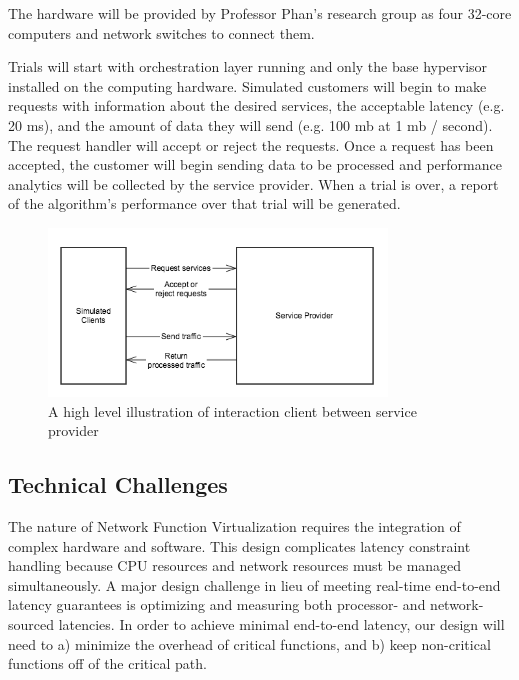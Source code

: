 \documentclass{sig-alternate}
\begin{document}
The hardware will be provided by Professor Phan's research group as four 32-core computers and network switches to connect them.

Trials will start with orchestration layer running and only the base hypervisor installed on the computing hardware. Simulated customers will begin to make requests with information about the desired services, the acceptable latency (e.g. 20 ms), and the amount of data they will send (e.g. 100 mb at 1 mb / second). The request handler will accept or reject the requests. Once a request has been accepted, the customer will begin sending data to be processed and performance analytics will be collected by the service provider. When a trial is over, a report of the algorithm's performance over that trial will be generated.

\begin{figure}[htb!]
 \begin{flushleft}
   \includegraphics[width=9cm]{system}
 \end{flushleft}
 \vspace{-12pt}
 \caption{A high level illustration of interaction client between service provider}
 \label{fig:some_graph}
\end{figure}

\subsection{Technical Challenges}
\label{subsec:tech_challenges}

The nature of Network Function Virtualization requires the integration of complex hardware and software. This design complicates latency constraint handling because CPU resources and network resources must be managed simultaneously. A major design challenge in lieu of meeting real-time end-to-end latency guarantees is optimizing and measuring both processor- and network-sourced latencies. In order to achieve minimal end-to-end latency, our design will need to a) minimize the overhead of critical functions, and b) keep non-critical functions off of the critical path.
\end{document}
